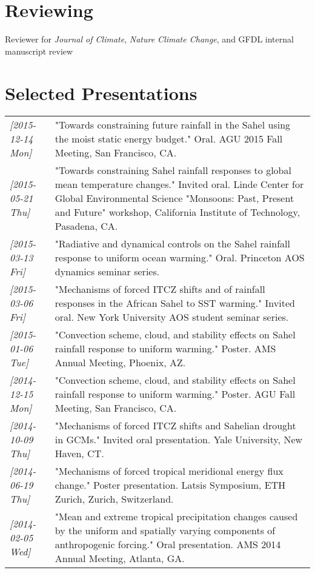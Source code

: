 \documentclass{article}
\begin{document}
\section*{Reviewing}
\label{sec:orgheadline16}
Reviewer for \emph{Journal of Climate}, \emph{Nature Climate Change}, and GFDL internal
manuscript review
\section*{Selected Presentations}
\label{sec:orgheadline17}
\begin{center}
\begin{tabularx}{\textwidth}{lX}
\textit{[2015-12-14 Mon]} & "Towards constraining future rainfall in the Sahel using the moist static energy budget." Oral.  AGU 2015 Fall Meeting, San Francisco, CA.\\
\textit{[2015-05-21 Thu]} & "Towards constraining Sahel rainfall responses to global mean temperature changes."  Invited oral.  Linde Center for Global Environmental Science "Monsoons: Past, Present and Future" workshop, California Institute of Technology, Pasadena, CA.\\
\textit{[2015-03-13 Fri]} & "Radiative and dynamical controls on the Sahel rainfall response to uniform ocean warming."  Oral.  Princeton AOS dynamics seminar series.\\
\textit{[2015-03-06 Fri]} & "Mechanisms of forced ITCZ shifts and of rainfall responses in the African Sahel to SST warming."  Invited oral.  New York University AOS student seminar series.\\
\textit{[2015-01-06 Tue]} & "Convection scheme, cloud, and stability effects on Sahel rainfall response to uniform warming."  Poster.  AMS Annual Meeting, Phoenix, AZ.\\
\textit{[2014-12-15 Mon]} & "Convection scheme, cloud, and stability effects on Sahel rainfall response to uniform warming."  Poster.  AGU Fall Meeting, San Francisco, CA.\\
\textit{[2014-10-09 Thu]} & "Mechanisms of forced ITCZ shifts and Sahelian drought in GCMs."  Invited oral presentation.  Yale University, New Haven, CT.\\
\textit{[2014-06-19 Thu]} & "Mechanisms of forced tropical meridional energy flux change."  Poster presentation.  Latsis Symposium, ETH Zurich, Zurich, Switzerland.\\
\textit{[2014-02-05 Wed]} & "Mean and extreme tropical precipitation changes caused by the uniform and spatially varying components of anthropogenic forcing."  Oral presentation.  AMS 2014 Annual Meeting, Atlanta, GA.\\

\end{tabularx}
\end{center}
\end{document}
